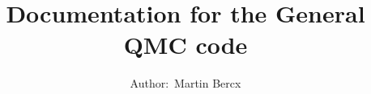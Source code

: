\documentclass[10pt,Arial]{article}
\begin{document}
\title{Documentation for the General QMC code}
\author{Author:~Martin Bercx}
\maketitle
\tableofcontents
\clearpage






%
%
%

%
%
%
%
\end{document}
